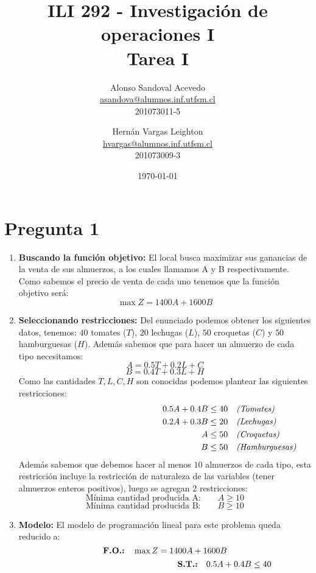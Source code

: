 \documentclass[spanish, fleqn]{article}
\title{ILI 292 - Investigación de operaciones I\\ Tarea I}
\author{
	Alonso Sandoval Acevedo\\ 
	\href{mailto:asandova@alumnos.inf.utfsm.cl}{asandova@alumnos.inf.utfsm.cl}\\
	201073011-5 
	\and 
	Hernán Vargas Leighton\\
	\href{mailto:hvargas@alumnos.inf.utfsm.cl}{hvargas@alumnos.inf.utfsm.cl}\\
	201073009-3}
\date{\today}
\begin{document}
\maketitle


\thispagestyle{empty}

\section{Pregunta 1}
	\begin{enumerate}
		\item
			\textbf{Buscando la función objetivo:} El local busca maximizar sus
			ganancias de la venta de sus almuerzos, a los cuales llamamos A y B
			respectivamente. Como sabemos el precio de venta de cada uno tenemos
			que la función objetivo será: $$ \max{Z} = 1400A + 1600B $$
		\item
			\textbf{Seleccionando restricciones:} Del enunciado podemos obtener
			los siguientes datos, tenemos: $40$ tomates ($T$), $20$ lechugas
			($L$), $50$ croquetas ($C$) y $50$ hamburguesas ($H$). Además
			sabemos que para hacer un almuerzo de cada tipo necesitamos:
			$$ A = 0.5T + 0.2L + C $$ $$ B = 0.4T + 0.3L + H $$ Como las 
			cantidades $T, L, C, H$ son conocidas podemos plantear las
			siguientes restricciones:
			\begin{align*}
				\hspace{5.33cm}
				0.5A + 0.4B &\leq 40 \quad\emph{(Tomates)}\\
				0.2A + 0.3B &\leq 20 \quad\emph{(Lechugas)}\\
						  A &\leq 50 \quad\emph{(Croquetas)}\\
						  B &\leq 50 \quad\emph{(Hamburguesas)}
			\end{align*}
			Además sabemos que debemos hacer al menos $10$ almuerzos de cada
			tipo, esta restricción incluye la restricción de naturaleza de las
			variables (tener almuerzos enteros positivos), luego se agregan 2
			restricciones: $$ \text{Mínima cantidad producida A:} \qquad A
			\geq 10 $$ $$\text{Mínima cantidad producida B:} \qquad B \geq 10 $$
		\item
			\textbf{Modelo:} El modelo de programación lineal para este problema
			queda reducido a: $$ \text{\textbf{F.O.:}} \quad \max{Z} = 1400A +
			1600B $$ \vspace{-1.05cm}
			\begin{align}
				\hspace{4.92cm} \text{\textbf{S.T.:}} \quad 
					0.5A + 0.4B &\leq 40 \label{1:1}\\

\end{align}
\end{enumerate}
\end{document}
